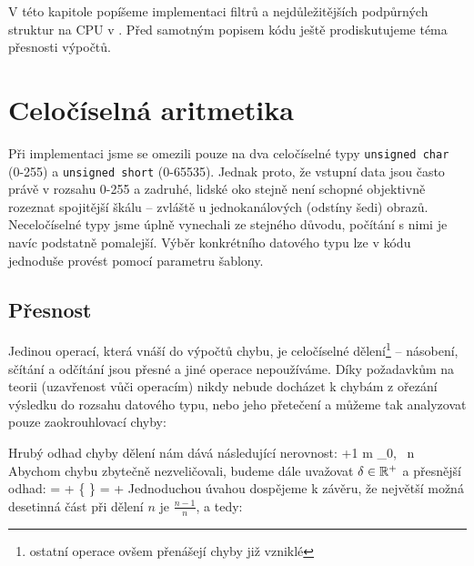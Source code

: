

V této kapitole popíšeme implementaci filtrů a nejdůležitějších podpůrných struktur na CPU v \Cpp. Před samotným popisem kódu ještě prodiskutujeme téma přesnosti výpočtů.

    \section{Celočíselná aritmetika}

    Při implementaci jsme se omezili pouze na dva celočíselné typy {\tt unsigned char} (0-255) a {\tt unsigned short} (0-65535). Jednak proto, že vstupní data jsou často právě v rozsahu 0-255 a zadruhé, lidské oko stejně není schopné objektivně rozeznat spojitější škálu -- zvláště u jednokanálových (odstíny šedi) obrazů. Neceločíselné typy jsme úplně vynechali ze stejného důvodu, počítání s nimi je navíc podstatně pomalejší. Výběr konkrétního datového typu lze v kódu jednoduše provést pomocí parametru šablony.

        \subsection{Přesnost}
        
        Jedinou operací, která vnáší do výpočtů chybu, je celočíselné dělení\footnote{ostatní operace ovšem přenášejí chyby již vzniklé} -- násobení, sčítání a odčítání jsou přesné a jiné operace nepoužíváme. Díky požadavkům na teorii (uzavřenost vůči operacím) nikdy nebude docházet k chybám z ořezání výsledku do rozsahu datového typu, nebo jeho přetečení a můžeme tak analyzovat pouze zaokrouhlovací chyby:

        Hrubý odhad chyby dělení nám dává následující nerovnost:
        \beq
         \le \Big\lfloor {} \Big\rfloor +1 \qquad m \in \Nn_0, \, n \in \Nn
        \eeq
        Abychom chybu zbytečně nezveličovali, budeme dále uvažovat $\delta \in \mathbb{R}^+$ a přesnější odhad:
        \beq
         = \Big\lfloor {} \Big\rfloor + \Big\{  \Big\} = \Big\lfloor {} \Big\rfloor + \delta
        \eeq
        Jednoduchou úvahou dospějeme k závěru, že největší možná desetinná část při dělení $n$ je $\frac{n-1}{n}$, a tedy:
        \beq
        \delta \leq {}
        \eeq

